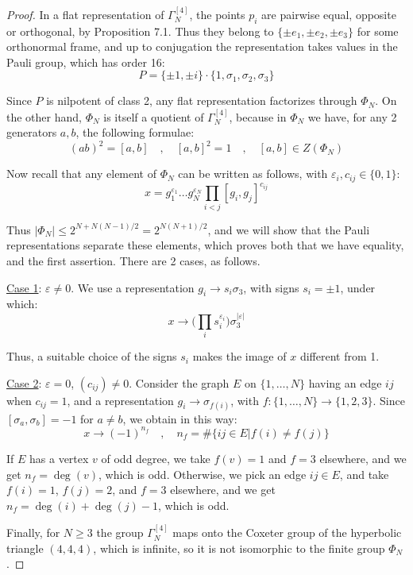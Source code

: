 \documentclass[12pt]{amsart}
\theoremstyle{definition}
\begin{document}
\begin{proof}
In a flat representation of $\Gamma_N^{[4]}$, the points $p_i$ are pairwise equal, opposite or orthogonal, by Proposition 7.1. Thus they belong to $\{\pm e_1,\pm e_2,\pm e_3\}$ for some orthonormal frame, and up to conjugation the representation takes values in the Pauli group, which has order 16:
$$P=\{\pm1,\pm i\}\cdot\{1,\sigma_1,\sigma_2,\sigma_3\}$$

Since $P$ is nilpotent of class 2, any flat representation factorizes through $\Phi_N$. On the other hand, $\Phi_N$ is itself a quotient of $\Gamma_N^{[4]}$, because in $\Phi_N$ we have, for any 2 generators $a,b$, the following formulae:
$$(ab)^2=[a,b]\quad,\quad[a,b]^2=1\quad,\quad[a,b]\in Z(\Phi_N)$$

Now recall that any element of $\Phi_N$ can be written as follows, with $\varepsilon_i,c_{ij}\in\{0,1\}$:
$$x=g_1^{\varepsilon_1}\ldots g_N^{\varepsilon_N}\prod_{i<j}[g_i,g_j]^{c_{ij}}$$

Thus $|\Phi_N|\leq2^{N+N(N-1)/2}=2^{N(N+1)/2}$, and we will show that the Pauli representations separate these elements, which proves both that we have equality, and the first assertion. There are 2 cases, as follows.

\underline{Case 1}: $\varepsilon\neq0$. We use a representation $g_i\to s_i\sigma_3$, with signs $s_i=\pm1$, under which:
$$x\to\Big(\prod_is_i^{\varepsilon_i}\Big)\sigma_3^{|\varepsilon|}$$

Thus, a suitable choice of the signs $s_i$ makes the image of $x$ different from 1.

\underline{Case 2}: $\varepsilon=0$, $(c_{ij})\neq0$. Consider the graph $E$ on $\{1,\ldots,N\}$ having an edge $ij$ when $c_{ij}=1$, and a representation $g_i\to\sigma_{f(i)}$, with $f:\{1,\ldots,N\}\to\{1,2,3\}$. Since $[\sigma_a,\sigma_b]=-1$ for $a\neq b$, we obtain in this way:
$$x\to(-1)^{n_f}\quad,\quad n_f=\#\Big\{ij\in E\Big|f(i)\neq f(j)\Big\}$$

If $E$ has a vertex $v$ of odd degree, we take $f(v)=1$ and $f=3$ elsewhere, and we get $n_f=\deg(v)$, which is odd. Otherwise, we pick an edge $ij\in E$, and take $f(i)=1$, $f(j)=2$, and $f=3$ elsewhere, and we get $n_f=\deg(i)+\deg(j)-1$, which is odd.

Finally, for $N\geq3$ the group $\Gamma_N^{[4]}$ maps onto the Coxeter group of the hyperbolic triangle $(4,4,4)$, which is infinite, so it is not isomorphic to the finite group $\Phi_N$.
\end{proof}
\end{document}

